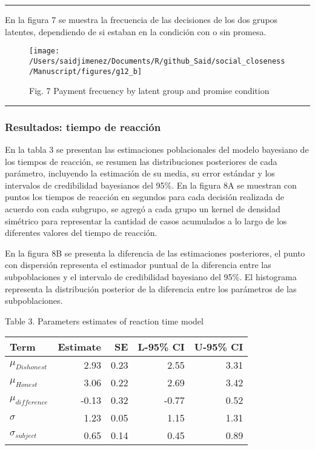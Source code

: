 \documentclass[]{article}
\begin{document}
\begin{center}\rule{0.5\linewidth}{\linethickness}\end{center}

En la figura 7 se muestra la frecuencia de las decisiones de los dos
grupos latentes, dependiendo de si estaban en la condición con o sin
promesa.

\begin{figure}

{\centering \texttt{[image: /Users/saidjimenez/Documents/R/github\_Said/social\_closeness/Manuscript/figures/g12\_b]} 

}

\caption{Fig. 7 Payment frecuency by latent group and promise condition}\label{fig:fig7}
\end{figure}

\begin{center}\rule{0.5\linewidth}{\linethickness}\end{center}

\subsubsection{Resultados: tiempo de
reacción}\label{resultados-tiempo-de-reaccion}

En la tabla 3 se presentan las estimaciones poblacionales del modelo
bayesiano de los tiempos de reacción, se resumen las distribuciones
posteriores de cada parámetro, incluyendo la estimación de su media, su
error estándar y los intervalos de credibilidad bayesianos del 95\%. En
la figura 8A se muestran con puntos los tiempos de reacción en segundos
para cada decisión realizada de acuerdo con cada subgrupo, se agregó a
cada grupo un kernel de densidad simétrico para representar la cantidad
de casos acumulados a lo largo de los diferentes valores del tiempo de
reacción.

En la figura 8B se presenta la diferencia de las estimaciones
posteriores, el punto con dispersión representa el estimador puntual de
la diferencia entre las subpoblaciones y el intervalo de credibilidad
bayesiano del 95\%. El histograma representa la distribución posterior
de la diferencia entre los parámetros de las subpoblaciones.

Table 3. Parameters estimates of reaction time model

\begin{longtable}[]{@{}lrrrr@{}}
\toprule
Term & Estimate & SE & L-95\% CI & U-95\% CI\tabularnewline
\midrule
\endhead
\(\mu_{Dishonest}\) & 2.93 & 0.23 & 2.55 & 3.31\tabularnewline
\(\mu_{Honest}\) & 3.06 & 0.22 & 2.69 & 3.42\tabularnewline
\(\mu_{difference}\) & -0.13 & 0.32 & -0.77 & 0.52\tabularnewline
\(\sigma\) & 1.23 & 0.05 & 1.15 & 1.31\tabularnewline
\(\sigma_{subject}\) & 0.65 & 0.14 & 0.45 & 0.89\tabularnewline
\bottomrule
\end{longtable}
\end{document}
